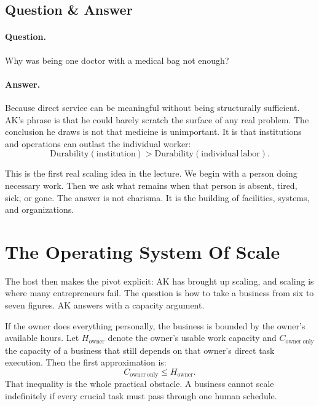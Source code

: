\subsection{Question \& Answer}

\paragraph{Question.}
Why was being one doctor with a medical bag not enough?

\paragraph{Answer.}
Because direct service can be meaningful without being structurally sufficient. AK's phrase is that he could barely scratch the surface of any real problem. The conclusion he draws is not that medicine is unimportant. It is that institutions and operations can outlast the individual worker:
\begin{equation}
\mathrm{Durability}(\mathrm{institution})
>
\mathrm{Durability}(\mathrm{individual\ labor}).
\end{equation}

This is the first real scaling idea in the lecture. We begin with a person doing necessary work. Then we ask what remains when that person is absent, tired, sick, or gone. The answer is not charisma. It is the building of facilities, systems, and organizations.

\section{The Operating System Of Scale}

The host then makes the pivot explicit: AK has brought up scaling, and scaling is where many entrepreneurs fail. The question is how to take a business from six to seven figures. AK answers with a capacity argument.

If the owner does everything personally, the business is bounded by the owner's available hours. Let \(H_{\mathrm{owner}}\) denote the owner's usable work capacity and \(C_{\mathrm{owner\ only}}\) the capacity of a business that still depends on that owner's direct task execution. Then the first approximation is:
\begin{equation}
C_{\mathrm{owner\ only}} \leq H_{\mathrm{owner}}.
\end{equation}
That inequality is the whole practical obstacle. A business cannot scale indefinitely if every crucial task must pass through one human schedule.

